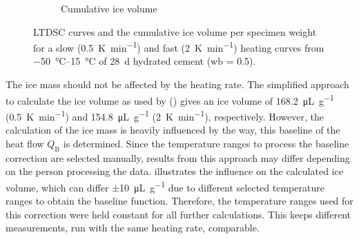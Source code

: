 \begin{figure}[!htb]
\begin{subfigure}{.485\textwidth}
	  \caption{Cumulative ice volume}
	  \label{fig:ltdsc_result_heating_rate_b}

	\end{subfigure}

    \caption{\ac{LTDSC} curves and the cumulative ice volume per specimen weight for a slow (\qty{0.5}{\kelvin\per\minute}) and fast (\qty{2}{\kelvin\per\minute}) heating curves from \qtyrange{-50}{15}{\celsius} of \qty{28}{\day} hydrated cement (\ac{wb} = \num{0.5}).}
    \label{fig:ltdsc_result_heating_rate}
\end{figure}

The ice mass should not be affected by the heating rate.
The simplified approach to calculate the ice volume as used by \textcite{mueller.2021,unbehau.2025} () gives an ice volume of \qty{168.2}{\micro\liter\per\gram} (\qty{0.5}{\kelvin\per\minute}) and \qty{154.8}{\micro\liter\per\gram} (\qty{2}{\kelvin\per\minute}), respectively.
However, the calculation of the ice mass is heavily influenced by the way, this baseline of the heat flow $Q_\text{B}$ is determined.
Since the temperature ranges to process the baseline correction are selected manually, results from this approach may differ depending on the person processing the data.
 illustrates the influence on the calculated ice volume, which can differ $\pm$\qty{10}{\micro\liter\per\gram} due to different selected temperature ranges to obtain the baseline function.
Therefore, the temperature ranges used for this correction were held constant for all further calculations.
This keeps different measurements, run with the same heating rate, comparable.


